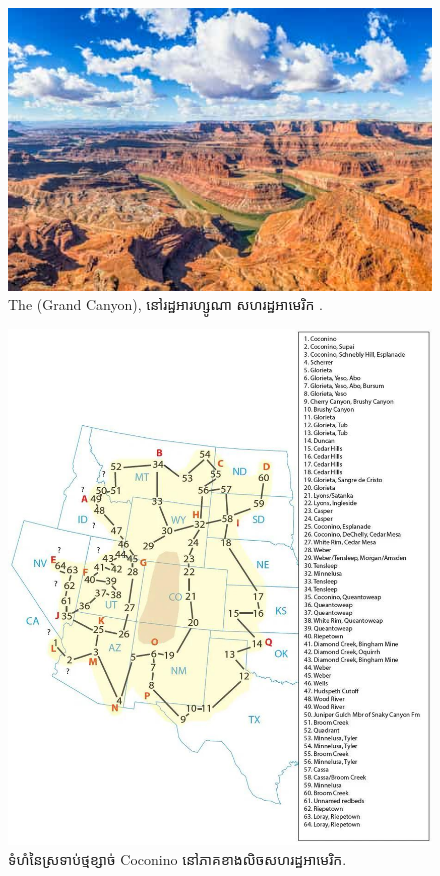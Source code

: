\documentclass[10pt,twocolumn,letterpaper]{article}
\begin{document}
\begin{figure}[b]
\begin{center}
   \includegraphics[width=1\linewidth]{grand-canyon.jpg}

\end{center}
   \caption{The (Grand Canyon), នៅរដ្ឋអារហ្សូណា សហរដ្ឋអាមេរិក \cite{49}.}
\label{fig:2}
\label{fig:onecol}
\end{figure}

\begin{figure}[t]
\begin{center}
   \includegraphics[width=1\linewidth]{coconino.jpg}
\end{center}
   \caption{ទំហំនៃស្រទាប់ថ្មខ្សាច់ Coconino នៅភាគខាងលិចសហរដ្ឋអាមេរិក\cite{21}.}
\label{fig:3}
\label{fig:onecol}
\end{figure}
\end{document}
